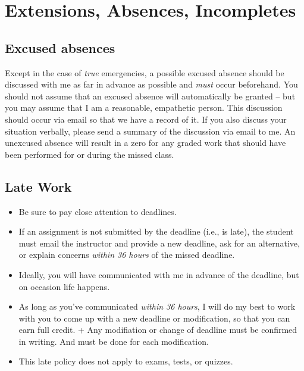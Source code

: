 \hypertarget{extensions-absences-incompletes}{%
\section{Extensions, Absences, Incompletes}\label{extensions-absences-incompletes}}

\hypertarget{excused-absences}{%
\subsection{Excused absences}\label{excused-absences}}

Except in the case of \emph{true} emergencies, a possible excused absence should be discussed with me as far in advance as possible and \emph{must} occur beforehand.
You should not assume that an excused absence will automatically be granted -- but you may assume that I am a reasonable, empathetic person.
This discussion should occur via email so that we have a record of it.
If you also discuss your situation verbally, please send a summary of the discussion via email to me.
An unexcused absence will result in a zero for any graded work that should have been performed for or during the missed class.

\hypertarget{late-work}{%
\subsection{Late Work}\label{late-work}}

\begin{itemize}
\tightlist
\item
  Be sure to pay close attention to deadlines.
\item
  If an assignment is not submitted by the deadline (i.e., is late), the student must email the instructor and provide a new deadline, ask for an alternative, or explain concerns \emph{within 36 hours} of the missed deadline.
\item
  Ideally, you will have communicated with me in advance of the deadline, but on occasion life happens.
\item
  As long as you've communicated \emph{within 36 hours}, I will do my best to work with you to come up with a new deadline or modification, so that you can earn full credit. + Any modifiation or change of deadline must be confirmed in writing. And must be done for each modification.
\item
  This late policy does not apply to exams, tests, or quizzes.
\end{itemize}

